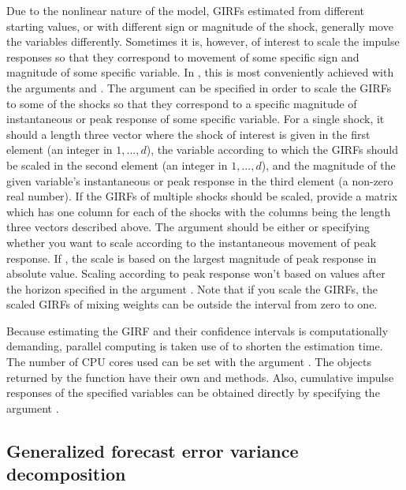 \documentclass[nojss]{jss}
\begin{document}
Due to the nonlinear nature of the model, GIRFs estimated from different starting values, or with different sign or magnitude of the shock, generally move the variables differently. Sometimes it is, however, of interest to scale the impulse responses so that they correspond to movement of some specific sign and magnitude of some specific variable. In , this is most conveniently achieved with the arguments  and . The argument  can be specified in order to scale the GIRFs to some of the shocks so that they correspond to a specific magnitude of instantaneous or peak response of some specific variable. For a single shock, it should a length three vector where the shock of interest is given in the first element (an integer in $1,...,d$), the variable according to which the GIRFs should be scaled in the second element (an integer in $1,...,d$), and the magnitude of the given variable's instantaneous or peak response in the third element (a non-zero real number). If the GIRFs of multiple shocks should be scaled, provide a matrix which has one column for each of the shocks with the columns being the length three vectors described above. The argument  should be either  or  specifying whether you want to scale according to the instantaneous movement of peak response. If , the scale is based on the largest magnitude of peak response in absolute value. Scaling according to peak response won't based on values after the horizon specified in the argument . Note that if you scale the GIRFs, the scaled GIRFs of mixing weights can be outside the interval from zero to one.

Because estimating the GIRF and their confidence intervals is computationally demanding, parallel computing is taken use of to shorten the estimation time. The number of CPU cores used can be set with the argument . The objects returned by the  function have their own  and  methods. Also, cumulative impulse responses of the specified variables can be obtained directly by specifying the argument .

\subsection{Generalized forecast error variance decomposition}
\end{document}
